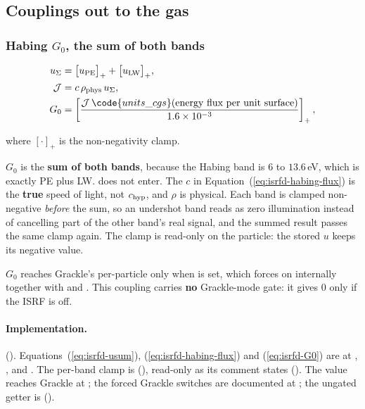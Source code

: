 \subsection{Couplings out to the gas}
\label{sec:isrf-eqdisc-couplings}

\subsubsection{Habing $G_0$, the sum of both bands}

\begin{align}
  u_\Sigma &= \big[u_{\rm PE}\big]_+ + \big[u_{\rm LW}\big]_+,
  \label{eq:isrfd-usum} \\
  \mathcal{J} &= c\, \rho_{\rm phys}\, u_\Sigma,
  \label{eq:isrfd-habing-flux} \\
  G_0 &= \left[\frac{\mathcal{J}\,\code{units\_cgs}(\text{energy flux per unit surface})}
    {1.6\times10^{-3}}\right]_+,
  \label{eq:isrfd-G0}
\end{align}

where $[\cdot]_+$ is the non-negativity clamp.

$G_0$ is the \textbf{sum of both bands}, because the Habing band is $6$ to
$13.6$\,eV, which is exactly PE plus LW.
 does not enter. The $c$ in
Equation~(\ref{eq:isrfd-habing-flux}) is the \textbf{true} speed of light, not
$c_{\rm hyp}$, and $\rho$ is physical. Each band is clamped non-negative
\emph{before} the sum, so an undershot band reads as zero
illumination instead of cancelling part of the other band's real signal, and the
summed result passes the same clamp again. The clamp is read-only on the
particle: the stored $u$ keeps its negative value.

$G_0$ reaches Grackle's per-particle  only when
 is set, which
 forces on internally together with
 and . This coupling carries
\textbf{no} Grackle-mode gate: it gives 0 only if the ISRF is off.

\paragraph{Implementation.} 
(). Equations~(\ref{eq:isrfd-usum}),
(\ref{eq:isrfd-habing-flux}) and (\ref{eq:isrfd-G0}) are at
, ,  and
. The per-band clamp is
 (),
read-only as its comment states (). The value
reaches Grackle at ; the forced Grackle switches are
documented at ; the ungated getter is
 ().

